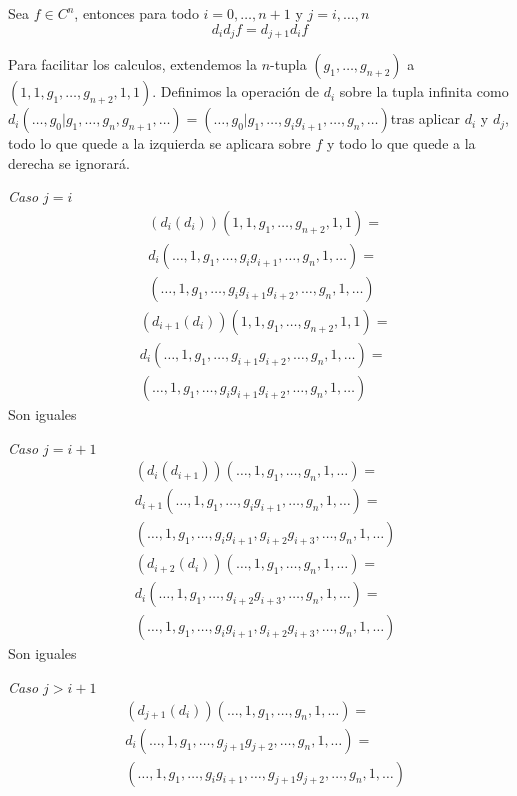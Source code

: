 \begin{lema}\label{lem:coborde}
	Sea $f\in C^n$, entonces para todo $i=0,\ldots,n+1$ y $j=i,\ldots,n$
	\begin{equation}
		d_id_jf=d_{j+1}d_if
	\end{equation}
	\begin{demostracion}
		Para facilitar los calculos, extendemos la $n$-tupla $(g_1,\ldots,g_{n+2})$ a $(1,1,g_1,\ldots,g_{n+2},1,1)$.
		Definimos la operación de $d_i$ sobre la tupla infinita como $d_i(\ldots,g_0|g_1,\ldots,g_n,g_{n+1},\ldots) = (\ldots,g_0|g_1,\ldots,g_ig_{i+1},\ldots,g_n,\ldots)$tras aplicar $d_i$ y $d_j$, todo lo que quede a la izquierda se aplicara sobre $f$ y todo lo que quede a la derecha se ignorará. 
		
		\textit{Caso $j=i$}
		\begin{align*}
			&(d_i(d_i))(1,1,g_1,\ldots,g_{n+2},1,1) = \\
			&d_i(\ldots,1,g_1,\ldots,g_ig_{i+1},\ldots,g_n,1,\ldots) = \\
			&(\ldots,1,g_1,\ldots,g_ig_{i+1}g_{i+2},\ldots,g_n,1,\ldots)
		\end{align*}
		\begin{align*}
			&(d_{i+1}(d_i))(1,1,g_1,\ldots,g_{n+2},1,1) = \\
			&d_i(\ldots,1,g_1,\ldots,g_{i+1}g_{i+2},\ldots,g_n,1,\ldots) = \\
			&(\ldots,1,g_1,\ldots,g_ig_{i+1}g_{i+2},\ldots,g_n,1,\ldots)
		\end{align*}
		Son iguales
		
		\textit{Caso $j=i+1$}
		\begin{align*}
			&(d_i(d_{i+1}))(\ldots,1,g_1,\ldots,g_n,1,\ldots) = \\
			&d_{i+1}(\ldots,1,g_1,\ldots,g_ig_{i+1},\ldots,g_n,1,\ldots) = \\
			&(\ldots,1,g_1,\ldots,g_ig_{i+1},g_{i+2}g_{i+3},\ldots,g_n,1,\ldots)
		\end{align*}
		\begin{align*}
			&(d_{i+2}(d_i))(\ldots,1,g_1,\ldots,g_n,1,\ldots) = \\
			&d_i(\ldots,1,g_1,\ldots,g_{i+2}g_{i+3},\ldots,g_n,1,\ldots) = \\
			&(\ldots,1,g_1,\ldots,g_ig_{i+1},g_{i+2}g_{i+3},\ldots,g_n,1,\ldots)
		\end{align*}
		Son iguales
		
		\textit{Caso $j>i+1$}
		\begin{align*}
			&(d_{j+1}(d_i))(\ldots,1,g_1,\ldots,g_n,1,\ldots) = \\
			&d_i(\ldots,1,g_1,\ldots,g_{j+1}g_{j+2},\ldots,g_n,1,\ldots) = \\
			&(\ldots,1,g_1,\ldots,g_ig_{i+1},\ldots,g_{j+1}g_{j+2},\ldots,g_n,1,\ldots)
		\end{align*}
		

\end{demostracion}
\end{lema}
